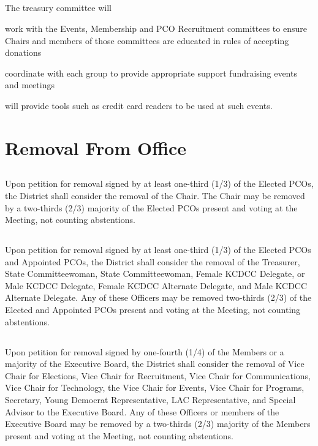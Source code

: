 \documentclass{article}
\newcommand{\fortythird}{\nth{43}}
\newcommand{\district}{\fortythird{} District}
\newcommand{\thedistrict}{the \district{}}
\begin{document}
\subsection{}
The treasury committee will
\begin{inlinealphalist}
    \item work with the Events, Membership and PCO Recruitment committees to ensure Chairs and members of those committees are educated in rules of accepting donations
    \item coordinate with each group to provide appropriate support fundraising events and meetings
    \item will provide tools such as credit card readers to be used at such events.
\end{inlinealphalist}

\section{Removal From Office}
\subsection{}
Upon petition for removal signed by at least one-third (1/3) of the Elected PCOs, \thedistrict{} shall consider the removal of the Chair. The Chair may be removed by a two-thirds (2/3) majority of the Elected PCOs present and voting at the Meeting, not counting abstentions.

\subsection{}
Upon petition for removal signed by at least one-third (1/3) of the Elected PCOs and Appointed PCOs, \thedistrict{} shall consider the removal of the Treasurer, State Committeewoman, State Committeewoman, Female KCDCC Delegate, or Male KCDCC Delegate, Female KCDCC Alternate Delegate, and Male KCDCC Alternate Delegate. Any of these Officers may be removed two-thirds (2/3) of the Elected and Appointed PCOs present and voting at the Meeting, not counting abstentions.

\subsection{}
Upon petition for removal signed by one-fourth (1/4) of the Members or a majority of the Executive Board, \thedistrict{} shall consider the removal of Vice Chair for Elections, Vice Chair for Recruitment, Vice Chair for Communications, Vice Chair for Technology, the Vice Chair for Events, Vice Chair for Programs, Secretary, Young Democrat Representative, LAC Representative, and Special Advisor to the Executive Board. Any of these Officers or members of the Executive Board may be removed by a two-thirds (2/3) majority of the Members present and voting at the Meeting, not counting abstentions.
\end{document}
